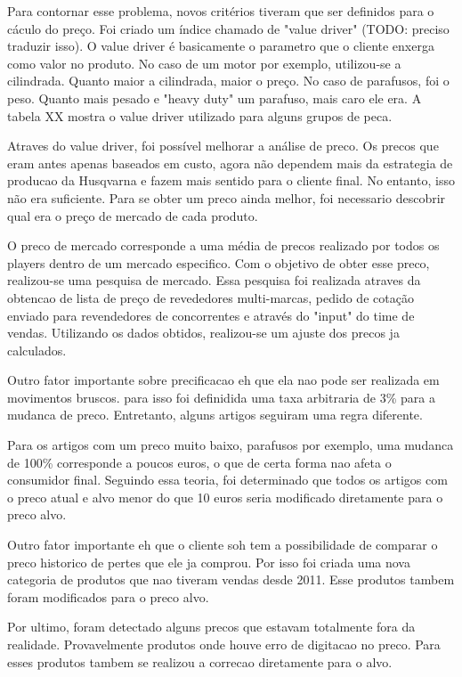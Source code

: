 \documentclass[12pt]{article}
\begin{document}
	Para contornar esse problema, novos critérios tiveram que ser definidos para o cáculo do preço. Foi criado um índice chamado de "value driver" (TODO: preciso traduzir isso). O value driver é basicamente o parametro que o cliente enxerga como valor no produto. No caso de um motor por exemplo, utilizou-se a cilindrada. Quanto maior a cilindrada, maior o preço. No caso de parafusos, foi o peso. Quanto mais pesado e "heavy duty" um parafuso, mais caro ele era. A tabela XX mostra o value driver utilizado para alguns grupos de peca.


	Atraves do value driver, foi possível melhorar a análise de preco. Os precos que eram antes apenas baseados em custo, agora não dependem mais da estrategia de producao da Husqvarna e fazem mais sentido para o cliente final. No entanto, isso não era suficiente. Para se obter um preco ainda melhor, foi necessario descobrir qual era o preço de mercado de cada produto.

	O preco de mercado corresponde a uma média de precos realizado por todos os players dentro de um mercado especifico. Com o objetivo de obter esse preco, realizou-se uma pesquisa de mercado. Essa pesquisa foi realizada atraves da obtencao de lista de preço de revededores multi-marcas, pedido de cotação enviado para revendedores de concorrentes e através do "input" do time de vendas. Utilizando os dados obtidos, realizou-se um ajuste dos precos ja calculados.

	Outro fator importante sobre precificacao eh que ela nao pode ser realizada em movimentos bruscos. para isso foi definidida uma taxa arbitraria de 3\% para a mudanca de preco. Entretanto, alguns artigos seguiram uma regra diferente.

	Para os artigos com um preco muito baixo, parafusos por exemplo, uma mudanca de 100\% corresponde a poucos euros, o que de certa forma nao afeta o consumidor final. Seguindo essa teoria, foi determinado que todos os artigos com o preco atual e alvo menor do que 10 euros seria modificado diretamente para o preco alvo.

Outro fator importante eh que o cliente soh tem a possibilidade de comparar o preco historico de pertes que ele ja comprou. Por isso foi criada uma nova categoria de produtos que nao tiveram vendas desde 2011. Esse produtos tambem foram modificados para o preco alvo.

Por ultimo, foram detectado alguns precos que estavam totalmente fora da realidade. Provavelmente produtos onde houve erro de digitacao no preco. Para esses produtos tambem se realizou a correcao diretamente para o alvo.
\end{document}
